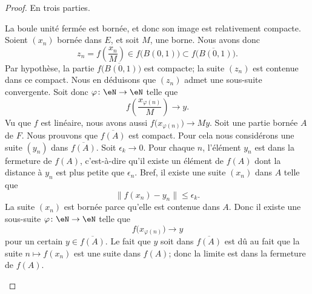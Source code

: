 \begin{proof}
	En trois parties.
	\begin{subproof}
		\spitem[\ref{ITEMooAFNXooUGbZsh} \( \Rightarrow\) \ref{ItemJIkpUbLii}]
		La boule unité fermée est bornée, et donc son image est relativement compacte.
		\spitem[\ref{ItemJIkpUbLii} \( \Rightarrow\) \ref{ITEMooQKISooBpyyee}]
		Soient \( (x_n)\) bornée dans \( E\), et soit \( M\), une borne. Nous avons donc
		\begin{equation}
			z_n=f\left( \frac{ x_n }{ M } \right)\in f\big( B(0,1) \big)\subset \overline{f\big( B(0,1) \big)}.
		\end{equation}
		Par hypothèse, la partie \( \overline{f\big( B(0,1) \big)}\) est compacte; la suite \( (z_n)\) est contenue dans ce compact. Nous en déduisons que \( (z_n)\) admet une sous-suite convergente. Soit donc \( \varphi\colon \eN\to \eN\) telle que
		\begin{equation}
			f\left( \frac{ x_{\varphi(n)} }{ M } \right)\to y.
		\end{equation}
		Vu que \( f\) est linéaire, nous avons aussi \( f\big( x_{\varphi(n)} \big)\to My\).
		\spitem[\ref{ITEMooQKISooBpyyee} \( \Rightarrow\) \ref{ITEMooAFNXooUGbZsh}]
		Soit une partie bornée \( A\) de \( F\). Nous prouvons que \( \overline{ f(A) }\) est compact. Pour cela nous considérons une suite \( (y_n)\) dans \( \overline{ f(A) }\). Soit \( \epsilon_k\to 0\). Pour chaque \( n\), l'élément \( y_n\) est dans la fermeture de \( f(A)\), c'est-à-dire qu'il existe un élément de \( f(A)\) dont la distance à \( y_n\) est plus petite que \( \epsilon_n\). Bref, il existe une suite \( (x_n)\) dans \( A\) telle que
		\begin{equation}
			\| f(x_n)-y_n \|\leq \epsilon_k.
		\end{equation}
		La suite \( (x_n)\) est bornée parce qu'elle est contenue dans \( A\). Donc il existe une sous-suite \( \varphi\colon \eN\to \eN\) telle que
		\begin{equation}
			f\big( x_{\varphi(n)} \big)\to y
		\end{equation}
		pour un certain \( y\in \overline{ f(A) }\). Le fait que \( y\) soit dans \( \overline{ f(A) }\) est dû au fait que la suite \( n\mapsto f(x_n)\) est une suite dans \( f(A)\); donc la limite est dans la fermeture de \( f(A)\).


\end{subproof}
\end{proof}
